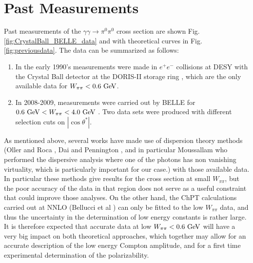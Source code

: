 \section{Past Measurements}
Past measurements of the $\gamma\gamma\to \pi^0\pi^0$ cross section are shown Fig.\,\ref{fig:CrystalBall_BELLE_data} and  with theoretical curves in Fig.\,\ref{fig:previousdata}. The data can be
summarized as follows: 
\begin{enumerate}
    \item 
In the early 1990's measurements were made in $e^+e^-$ collisions at DESY
with the Crystal Ball detector at the DORIS-II storage ring \cite{Marsiske:1990hx}, which are the only
available data for $W_{\pi\pi}<0.6{\rm~ GeV}$. 
\item In 2008-2009, measurements were carried out by BELLE
for $0.6{\rm~ GeV}<W_{\pi\pi}<4.0 {\rm~ GeV}$ \cite{Mori:2007bu,Uehara:2008ep,Uehara:2009cka}. Two data sets were produced with different selection cuts on $|\cos{\theta^*}|$.
\end{enumerate}
As mentioned above, several works have made use of dispersion theory methods
(Oller and
Roca \cite{Oller:2008kf}, Dai and Pennington \cite{Dai:2016ytz}, and
in particular Moussallam \cite{Moussallam:2013una} who performed the
dispersive analysis where one of the photons has non vanishing
virtuality, which is particularly important for our case.) with those
available data. In particular these methods give results for the cross
section at small $W_{\pi\pi}$, but the poor accuracy of the data in
that region does not serve as a useful constraint that could improve
those analyses. On the other hand, the ChPT calculations carried out
at NNLO (Bellucci et al \cite{Bellucci:1994hx,Bellucci:1994eb} ) can
only be fitted to the low $W_{\pi\pi}$ data, and thus the uncertainty
in the determination of low energy constants is rather large. It is therefore
expected that accurate data at low $W_{\pi\pi}<0.6{\rm~ GeV}$ will
have a very big impact on both theoretical approaches, which together
may allow for an accurate description of the low energy Compton
amplitude, and for a first time experimental determination of the
polarizability.

